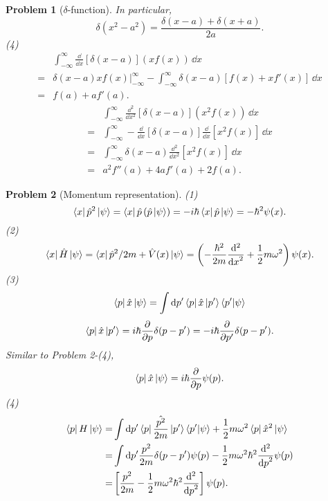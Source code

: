 \documentclass{article}
\theoremstyle{1}
\newtheorem{problem}{Problem}
\newcommand{\pa}{\partial}
\begin{document}
\begin{problem}[$\delta$-function]
    In particular, 
    \begin{equation}
        \boxed{\delta(x^2-a^2)=\frac{\delta(x-a)+\delta(x+a)}{2a}.}
    \end{equation}
    (4) \begin{align}
        &\int_{-\infty}^{\infty}\frac{\dd}{\dd{x}}\left[\delta(x-a)\right]\left(x f(x)\right)\, \dd{x}\\
        =&\left.\delta(x-a)xf(x)\right|_{-\infty}^{\infty}-\int_{-\infty}^{\infty}\delta(x-a)\left[f(x)+xf'(x)\right]\, \dd{x}\\
        =&f(a)+af'(a).
    \end{align}
    \begin{align}
        &\int_{-\infty}^{\infty}\frac{\dd^2}{\dd{x}^2}\left[\delta(x-a)\right]\left(x^2 f(x)\right)\, \dd{x}\\
        =&\int_{-\infty}^{\infty}-\frac{\dd}{\dd{x}}\left[\delta(x-a)\right]\frac{\dd}{\dd{x}}\left[x^2 f(x)\right]\, \dd{x}\\
        =&\int_{-\infty}^{\infty}\delta(x-a)\frac{\dd^2}{\dd{x}^2}\left[x^2 f(x)\right]\, \dd{x}\\
        =&a^2f''(a)+4af'(a)+2f(a).
    \end{align}
\end{problem}
\begin{problem}[Momentum representation]
    (1)\begin{equation}
        \bra{x}\hat{p}^2\ket{\psi}=\bra{x}\hat{p}\left(\hat{p}\ket{\psi}\right)=-i\hbar\bra{x}\hat{p}\ket{\psi}=-\hbar^2\psi(x).
    \end{equation}
    (2) \begin{equation}
        \bra{x}\hat{H}\ket{\psi}=\bra{x}\hat{p}^2/2m+\hat{V}(x)\ket{\psi}=\left(-\frac{\hbar^2}{2m}\frac{\dd^2}{\dd{x}^2}+\frac{1}{2}m\omega^2\right)\psi(x).
    \end{equation}
    (3) \begin{equation}
        \bra{p}\hat{x}\ket{\psi}=\int\dd{p'}\bra{p}\hat{x}\ket{p'}\braket{p'}{\psi}
    \end{equation}
    \begin{equation}
        \bra{p}\hat{x}\ket{p'}=i\hbar\frac{\pa}{\pa p}\delta(p-p')=-i\hbar\frac{\pa}{\pa p'}\delta(p-p').
    \end{equation}
    Similar to Problem 2-(4),
    \begin{equation}
        \bra{p}\hat{x}\ket{\psi}=i\hbar\frac{\pa}{\pa p}\psi(p).
    \end{equation}
    (4) \begin{align}
        \bra{p}H\ket{\psi}=&\int\dd{p'}\bra{p}\frac{\hat{p^2}}{2m}\ket{p'}\bra{p'}\ket{\psi}+\frac{1}{2}m\omega^2\bra{p}\hat{x}^2\ket{\psi}\notag\\
        =&\int{\dd{p'}}\frac{p^2}{2m}\delta(p-p')\psi(p)-\frac{1}{2}m\omega^2\hbar^2\frac{\dd^2}{\dd{p}^2}\psi(p)\notag\\
        =&\left[\frac{p^2}{2m}-\frac{1}{2}m\omega^2\hbar^2\frac{\dd^2}{\dd{p}^2}\right]\psi(p).
    \end{align}
\end{problem}
\end{document}

